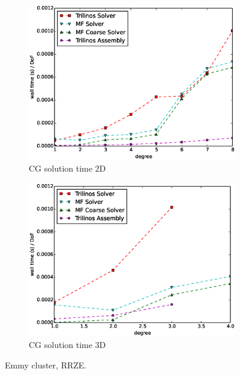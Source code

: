 \documentclass[preprint,12pt,times]{elsarticle}
\begin{document}
\begin{figure}[!ht]
\begin{subfigure}[b]{0.45\textwidth}
    \includegraphics[width=\textwidth]{Emmy_RRZE_solver2d.eps}
    \caption{CG solution time 2D}
    \label{fig:benchmark_miehe_Emmy_sol2}
  \end{subfigure}
  \begin{subfigure}[b]{0.45\textwidth}
    \centering
    \includegraphics[width=\textwidth]{Emmy_RRZE_solver3d.eps}
    \caption{CG solution time 3D}
    \label{fig:benchmark_miehe_Emmy_sol3}
  \end{subfigure}
  \caption{Emmy cluster, RRZE.}%
  \label{fig:benchmark_miehe_Emmy}
\end{figure}
\end{document}
